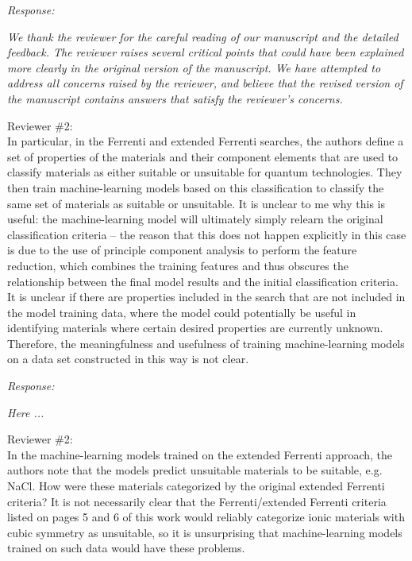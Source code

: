 \documentclass[11pt, a4paper]{letter} %
\begin{document}
\textit{Response:}  

\textit{We thank the reviewer for the careful reading of our manuscript and the detailed feedback. The reviewer raises several critical points that could have been explained more clearly in the original version of the manuscript. We have attempted to address all concerns raised by the reviewer, and believe that the revised version of the manuscript contains answers that satisfy the reviewer’s concerns. } 

Reviewer \#2: \\
In particular, in the Ferrenti and extended Ferrenti searches, the authors define a set of properties of the materials and their component elements that are used to classify materials as either suitable or unsuitable for quantum technologies. They then train machine-learning models based on this classification to classify the same set of materials as suitable or unsuitable. It is unclear to me why this is useful: the machine-learning model will ultimately simply relearn the original classification criteria – the reason that this does not happen explicitly in this case is due to the use of principle component analysis to perform the feature reduction, which combines the training features and thus obscures the relationship between the final model results and the initial classification criteria. It is unclear if there are properties included in the search that are not included in the model training data, where the model could potentially be useful in identifying materials
where certain desired properties are currently unknown. Therefore, the meaningfulness and usefulness of training machine-learning models on a data set constructed in this way is not clear.

\textit{Response:} 

\textit{Here ... }


Reviewer \#2: \\
In the machine-learning models trained on the extended Ferrenti approach, the authors note that the models predict unsuitable materials to be suitable, e.g. NaCl. How were these materials categorized by the original extended Ferrenti criteria? It is not necessarily clear that the Ferrenti/extended Ferrenti criteria listed on pages 5 and 6 of this work would reliably categorize ionic materials with cubic symmetry as unsuitable, so it is unsurprising that machine-learning models trained on such data would have these problems.
\end{document}
